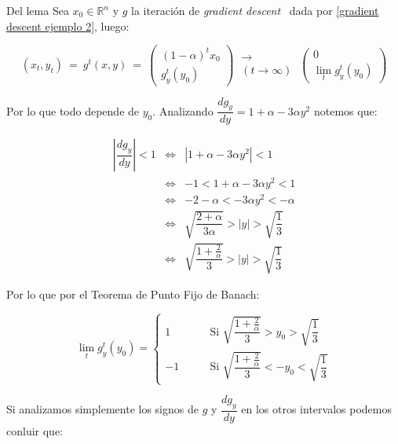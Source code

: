 \documentclass[11pt]{book}
\newcommand{\R}{{\mathbb{R}}}
\newcommand{\abs}[1]{\left\lvert#1\right\rvert}
\numberwithin{theorem}{subsection}
\newenvironment{proof}[1][Demostraci\'on]{\begin{trivlist}
		\item[\hskip \labelsep {\bfseries #1}]}{\end{trivlist}}
\newcommand{\dg}{\textit{gradient descent} \ }
\begin{document}
\begin{proof}{Del lema}
	Sea $x_0 \in \R^n$ y $g$ la iteraci\'on de \dg dada por \ref{gradient descent ejemplo 2}, luego:
	
	\begin{equation*}
		(x_t, y_t) \ = \ g^t(x,y) \ = \ \left(\begin{aligned}
		(1-\alpha)^tx_0 \\
		g_y^t(y_0)
		\end{aligned}\right) \ \substack{\longrightarrow \\ \left(t \rightarrow \infty\right)} \ \left(\begin{aligned}
		0 \\
		\lim\limits_t g_y^t(y_0)
		\end{aligned}\right)
	\end{equation*}
	
	Por lo que todo depende de $y_0$. Analizando $\dfrac{d g_y}{dy} = 1 + \alpha - 3\alpha y^2$ notemos que:
	
	\begin{equation*}
	\begin{aligned}
	\abs{\dfrac{d g_y}{dy}} < 1  & \Longleftrightarrow & \abs{1 + \alpha - 3\alpha y^2} < 1 \\
	 & \Longleftrightarrow & -1 < 1 + \alpha - 3\alpha y^2 < 1 \\
	  & \Longleftrightarrow &  -2 - \alpha < -3 \alpha y^2 < -\alpha \\
	   & \Longleftrightarrow &  \sqrt{\dfrac{2 + \alpha}{3\alpha}} > \abs{y} > \sqrt{\dfrac{1}{3}} \\
	   	   & \Longleftrightarrow &  \sqrt{\dfrac{1 + \frac{2}{\alpha}}{3}} > \abs{y} > \sqrt{\dfrac{1}{3}}
	\end{aligned}
	\end{equation*}
	
	Por lo que por el Teorema de Punto Fijo de Banach:
		
	\begin{equation*}
	\lim\limits_t g_y^t(y_0) = \left\lbrace \begin{aligned}
		1 & \qquad \text{Si } \sqrt{\dfrac{1 + \frac{2}{\alpha}}{3}} > y_0 > \sqrt{\dfrac{1}{3}} \\
		-1 & \qquad \text{Si } \sqrt{\dfrac{1 + \frac{2}{\alpha}}{3}} < -y_0 < \sqrt{\dfrac{1}{3}}
	\end{aligned} \right.
	\end{equation*}
	
	Si analizamos simplemente los signos de $g$ y $\dfrac{d g_y}{dy}$ en los otros intervalos podemos conluir que:
	

\end{proof}
\end{document}

